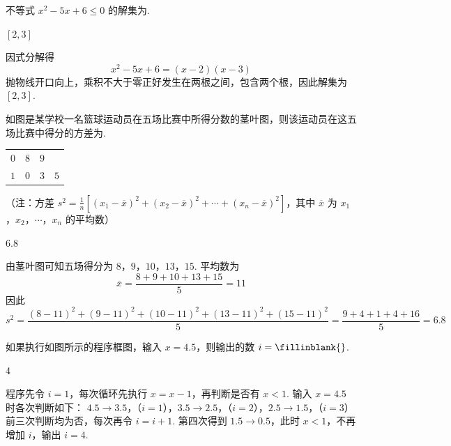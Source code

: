 \begin{problem}
不等式 \(x^{2} - 5x + 6 \leqslant 0\) 的解集为\fillinblank{}.
\end{problem}

\begin{answer}
\([2,3]\)
\end{answer}

\begin{solution}
因式分解得
\[
x^2-5x+6=(x-2)(x-3)
\]
抛物线开口向上，乘积不大于零正好发生在两根之间，包含两个根，因此解集为
\([2,3]\).
\end{solution}

\begin{problem}
如图是某学校一名篮球运动员在五场比赛中所得分数的茎叶图，则该运动员在这五场比赛中得分的方差为\fillinblank{}.
\begin{center}
\begin{tabular}{c|ccc}
\(0\) & \(8\) & \(9\) & \\
\(1\) & \(0\) & \(3\) & \(5\)
\end{tabular}
\end{center}
（注：方差 \( s^{2}=\frac{1}{n}\left[(x_{1}-\overline{x})^{2}+(x_{2}-\overline{x})^{2}+\cdots+(x_{n}-\overline{x})^{2}\right] \)，其中 \( \overline{x} \) 为 \(x_{1}\)，\(x_{2}\)，\(\cdots\)，\(x_{n}\) 的平均数）
\end{problem}

\begin{answer}
6.8
\end{answer}

\begin{solution}
由茎叶图可知五场得分为 \(8\)，\(9\)，\(10\)，\(13\)，\(15\). 平均数为
\[
\overline{x}=\frac{8+9+10+13+15}{5}=11
\]
因此
\[
s^2=\frac{(8-11)^2+(9-11)^2+(10-11)^2+(13-11)^2+(15-11)^2}{5}
 =\frac{9+4+1+4+16}{5}=6.8
\]
\end{solution}

\begin{problem}
如果执行如图所示的程序框图，输入 \(x = 4.5\)，则输出的数 \(i =\fillinblank{}\).
\end{problem}

\begin{answer}
4
\end{answer}

\begin{solution}
程序先令 \(i=1\)，每次循环先执行 \(x=x-1\)，再判断是否有 \(x<1\). 输入 \(x=4.5\) 时各次判断如下：
\(4.5\to3.5\)，（\(i=1\)），\(3.5\to2.5\)，（\(i=2\)），\(2.5\to1.5\)，（\(i=3\)）
前三次判断均为否，每次再令 \(i=i+1\). 第四次得到
\(1.5\to0.5\)，此时 \(x<1\)，不再增加 \(i\)，输出 \(i=4\).
\end{solution}


